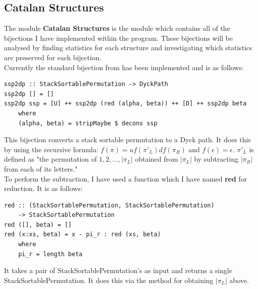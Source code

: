 \documentclass[12pt]{article}
\begin{document}
\subsection{Catalan Structures}
The module {\bf Catalan Structures} is the module which contains all of the bijections I have implemented within the program. These bijections will be analysed by finding statistics for each structure and investigating which statistics are preserved for each bijection.\\
Currently the standard bijection from \cite{Clae01} has been implemented and is as follows:
\begin{lstlisting}
ssp2dp :: StackSortablePermutation -> DyckPath
ssp2dp [] = []
ssp2dp ssp = [U] ++ ssp2dp (red (alpha, beta)) ++ [D] ++ ssp2dp beta
	where
	(alpha, beta) = stripMaybe $ decons ssp
\end{lstlisting}
This bijection converts a stack sortable permutation to a Dyck path. It does this by using the recursive formula: $f(\pi) = uf(\pi'_L)df(\pi_R)$ and $f(\epsilon) = \epsilon$. $\pi'_L$ is defined as "the permutation of $1, 2, ..., |\pi_L|$ obtained from $|\pi_L|$ by subtracting $|\pi_R|$ from each of its letters."\cite{Clae01}\\
To perform the subtraction, I have used a function which I have named {\bf red} for reduction. It is as follows:
\begin{lstlisting}
red :: (StackSortablePermutation, StackSortablePermutation) 
	-> StackSortablePermutation
red ([], beta) = []
red (x:xs, beta) = x - pi_r : red (xs, beta)
	where
	pi_r = length beta
\end{lstlisting}
It takes a pair of StackSortablePermutation's as input and returns a single StackSortablePermutation. It does this via the method for obtaining $|\pi_L|$ above.
\end{document}
